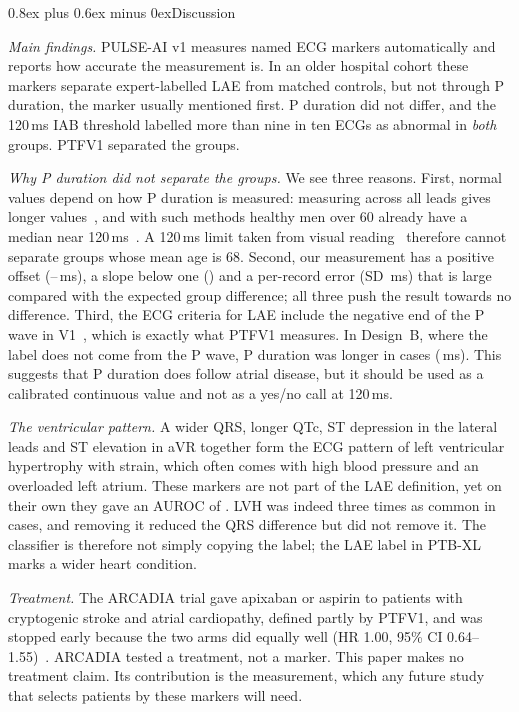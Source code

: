 \documentclass[conference]{IEEEtran}
\makeatletter
\def\section{\@startsection{section}{1}{\z@}{2.6ex plus 1.2ex minus 1ex}%
  {0.8ex plus 0.6ex minus 0ex}{\normalfont\normalsize\centering\bfseries}}
\makeatother
\begin{document}
\section{Discussion}
\label{sec:disc}

\textit{Main findings.} PULSE-AI v1 measures named ECG markers automatically and
reports how accurate the measurement is. In an older hospital cohort these
markers separate expert-labelled LAE from matched controls, but not through P
duration, the marker usually mentioned first. P duration did not differ, and
the 120\,ms IAB threshold labelled more than nine in ten ECGs as abnormal in
\emph{both} groups. PTFV1 separated the groups.

\textit{Why P duration did not separate the groups.} We see three reasons. First,
normal values depend on how P duration is measured: measuring across all leads
gives longer values~\cite{kligfield2007aha1}, and with such methods healthy men
over 60 already have a median near 120\,ms~\cite{rijnbeek2014normal}. A 120\,ms
limit taken from visual reading~\cite{bayesdeluna2012iab} therefore cannot
separate groups whose mean age is 68. Second, our measurement has a positive
offset (\nOffPLo--\nOffPHi\,ms), a slope below one (\nCompSlope) and a per-record
error (SD \nGTwoBiasSd\,ms) that is large compared with the expected group
difference; all three push the result towards no difference. Third, the ECG
criteria for LAE include the negative end of the P wave in
V1~\cite{hancock2009aha5}, which is exactly what PTFV1 measures. In Design~B,
where the label does not come from the P wave, P duration was longer in cases
(\nBDiff\,ms). This suggests that P duration does follow atrial disease, but it
should be used as a calibrated continuous value and not as a yes/no call at
120\,ms.

\textit{The ventricular pattern.} A wider QRS, longer QTc, ST depression in the
lateral leads and ST elevation in aVR together form the ECG pattern of left
ventricular hypertrophy with strain, which often comes with high blood pressure
and an overloaded left atrium. These markers are not part of the LAE definition,
yet on their own they gave an AUROC of \nAucRfB. LVH was indeed three times as
common in cases, and removing it reduced the QRS difference but did not remove
it. The classifier is therefore not simply copying the label; the LAE label in
PTB-XL marks a wider heart condition.

\textit{Treatment.} The ARCADIA trial gave apixaban or aspirin to patients with
cryptogenic stroke and atrial cardiopathy, defined partly by PTFV1, and was
stopped early because the two arms did equally well (HR 1.00, 95\% CI
0.64--1.55)~\cite{kamel2024arcadia}. ARCADIA tested a treatment, not a marker.
This paper makes no treatment claim. Its contribution is the measurement, which
any future study that selects patients by these markers will need.
\end{document}
